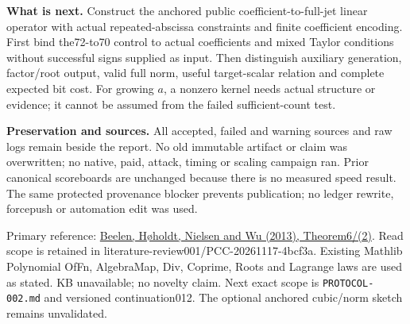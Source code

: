 \documentclass[10pt]{article}
\begin{document}
\textbf{What is next.} Construct the anchored public coefficient-to-full-jet
linear operator with actual repeated-abscissa constraints and finite
coefficient encoding. First bind the72-to70 control to actual coefficients
and mixed Taylor conditions without successful signs supplied as input.
Then distinguish auxiliary generation, factor/root output, valid full norm,
useful target-scalar relation and complete expected bit cost. For growing
$a$, a nonzero kernel needs actual structure or evidence; it cannot be assumed
from the failed sufficient-count test.

\textbf{Preservation and sources.} All accepted, failed and warning sources
and raw logs remain beside the report. No old immutable artifact or claim
was overwritten; no native, paid, attack, timing or scaling campaign ran.
Prior canonical scoreboards are unchanged because there is no measured
speed result. The same protected provenance blocker prevents publication;
no ledger rewrite, forcepush or automation edit was used.

Primary reference:
\href{https://doi.org/10.1109/TIT.2013.2243800}{Beelen, H\o holdt, Nielsen and Wu (2013), Theorem6/(2)}.
Read scope is retained in literature-review001/PCC-20261117-4bcf3a.
Existing Mathlib Polynomial OfFn, AlgebraMap, Div, Coprime, Roots and
Lagrange laws are used as stated. KB unavailable; no novelty claim.
Next exact scope is \texttt{PROTOCOL-002.md} and versioned continuation012.
The optional anchored cubic/norm sketch remains unvalidated.
\end{document}
